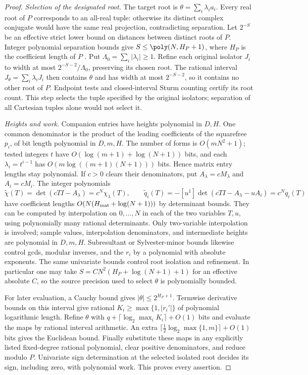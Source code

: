 \begin{proof}
\emph{Selection of the designated root.} The target root is
$\theta=\sum_i\lambda_i a_i$. Every real root of $P$ corresponds to an
all-real tuple: otherwise its distinct complex conjugate would have the same
real projection, contradicting separation. Let $2^{-S}$ be an effective
strict lower bound on distances between distinct roots of $P$. Integer
polynomial separation bounds give $S\le\poly(N,H_P+1)$, where $H_P$
is the coefficient length of $P$
\cite{basu2006-algorithms-in-real-algebraic-geometry,mehlhorn2015-from-approximate-factorization-to-root}.
Put $\Lambda_0=\sum_i|\lambda_i|\ge1$. Refine each original isolator
$J_i$ to width at most $2^{-S-2}/\Lambda_0$, preserving its chosen root.
The rational interval $J_\theta=\sum_i\lambda_iJ_i$ then contains $\theta$
and has width at most $2^{-S-2}$, so it contains no other root of $P$.
Endpoint tests and closed-interval Sturm counting certify its root count.
This step selects the tuple specified by the original isolators; separation
of all Cartesian tuples alone would not select it.

\emph{Heights and work.} Companion entries have heights polynomial in
$D,H$. One common denominator is the product of the leading coefficients
of the squarefree $p_i$, of bit length polynomial in $D,m,H$. The number
of forms is $O(mN^2+1)$; tested integers $t$ have
$O(\log(m+1)+\log(N+1))$ bits, and each $\lambda_i=t^{i-1}$ has
$O(m\log((m+1)(N+1)))$ bits. Hence matrix entry lengths stay polynomial.
If $c>0$ clears their denominators, put $A_\lambda=cM_\lambda$ and
$A_i=cM_i$. The integer polynomials
\[
 \widetilde\chi(T)=\det(cTI-A_\lambda)=c^N\chi_\lambda(T),\qquad
 \widetilde q_i(T)=-[u^1]\det(cTI-A_\lambda-uA_i)=c^Nq_i(T)
\]
have coefficient lengths $O(N(H_{\rm mat}+\log(N+1)))$ by determinant
bounds. They can be computed by interpolation on $0,\dots,N$ in each of
the two variables $T,u$, using polynomially many rational determinants.
Only two-variable interpolation is involved; sample values, interpolation
denominators, and intermediate heights are polynomial in $D,m,H$.
Subresultant or Sylvester-minor bounds likewise control gcds, modular
inverses, and the $r_i$ by a polynomial with absolute exponents. The same
univariate bounds control root isolation and refinement. In particular one
may take $S=C N^2(H_P+\log(N+1)+1)$ for an effective absolute $C$, so the
source precision used to select $\theta$ is polynomially bounded.

For later evaluation, a Cauchy bound gives $|\theta|\le2^{H_P+1}$.
Termwise derivative bounds on this interval give rational
$K_i\ge\max\{1,|r_i'|\}$ of polynomial logarithmic length. Refine
$\theta$ with $q+\lceil\log_2\max_iK_i\rceil+O(1)$ bits and evaluate the
maps by rational interval arithmetic. An extra
$\lceil\tfrac12\log_2\max\{1,m\}\rceil+O(1)$ bits gives the Euclidean
bound. Finally substitute these maps in any explicitly listed fixed-degree
rational polynomial, clear positive denominators, and reduce modulo $P$.
Univariate sign determination at the selected isolated root decides its
sign, including zero, with polynomial work. This proves every assertion.
\end{proof}

